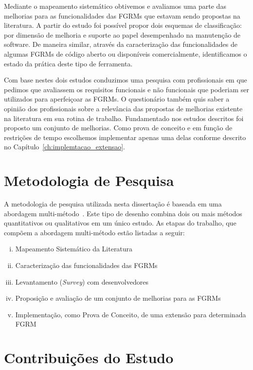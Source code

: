Mediante o mapeamento sistemático obtivemos e avaliamos uma parte das melhorias
para as funcionalidades das FGRMs que estavam sendo propostas na literatura. A
partir do estudo foi possível propor dois esquemas de classificação: por
dimensão de melhoria e suporte ao papel desempenhado na manutenção de software.
De maneira similar, através da caracterização das funcionalidades de algumas
FGRMs de código aberto ou disponíveis comercialmente, identificamos o estado da
prática deste tipo de ferramenta.

Com base nestes dois estudos conduzimos uma pesquisa com profissionais em que
pedimos que avaliassem os requisitos funcionais e não funcionais que poderiam
ser utilizados para aperfeiçoar as FGRMs. O questionário também quis saber a
opinião dos profissionais sobre a relevância das propostas de me\-lho\-ri\-as
existente na literatura em sua rotina de trabalho. Fundamentado nos estudos
descritos foi proposto um conjunto de melhorias. Como prova de conceito e em
função de restrições de tempo escolhemos implementar apenas uma delas conforme
descrito no Capítulo~\ref{ch:implemtacao_extensao}.

\section{Metodologia de Pesquisa}\label{sec:intro-metodologia}

A metodologia de pesquisa utilizada nesta dissertação é baseada em uma
abordagem multi-método~\cite{hesse2010mixed}. Este tipo de desenho combina dois
ou mais métodos quantitativos ou qualitativos em um único estudo. As etapas do
trabalho, que compõem a abordagem multi-método estão listadas a seguir:

\begin{enumerate}[(i)]
	\item Mapeamento Sistemático da Literatura~\cite{Petersen2008}
	\item Caracterização das funcionalidades das FGRMs
    \item Levantamento (\textit{Survey}) com
          desenvolvedores~\cite{wohlin2012experimentation}
	\item Proposição e avaliação de um conjunto de melhorias para as FGRMs
    \item Implementação, como Prova de Conceito, de uma extensão para
        determinada FGRM
\end{enumerate}

\section{Contribuições do Estudo}\label{sec:intro-contribuicao}

